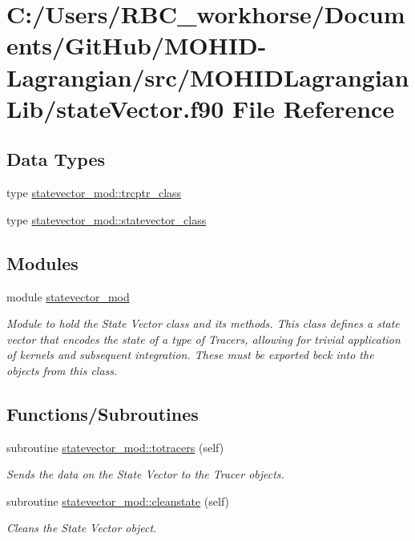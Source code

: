 \hypertarget{state_vector_8f90}{}\section{C\+:/\+Users/\+R\+B\+C\+\_\+workhorse/\+Documents/\+Git\+Hub/\+M\+O\+H\+I\+D-\/\+Lagrangian/src/\+M\+O\+H\+I\+D\+Lagrangian\+Lib/state\+Vector.f90 File Reference}
\label{state_vector_8f90}
\subsection*{Data Types}
\begin{DoxyCompactItemize}
\item 
type \mbox{\hyperlink{structstatevector__mod_1_1trcptr__class}{statevector\+\_\+mod\+::trcptr\+\_\+class}}
\item 
type \mbox{\hyperlink{structstatevector__mod_1_1statevector__class}{statevector\+\_\+mod\+::statevector\+\_\+class}}
\end{DoxyCompactItemize}
\subsection*{Modules}
\begin{DoxyCompactItemize}
\item 
module \mbox{\hyperlink{namespacestatevector__mod}{statevector\+\_\+mod}}
\begin{DoxyCompactList}\small\item\em Module to hold the State Vector class and its methods. This class defines a state vector that encodes the state of a type of Tracers, allowing for trivial application of kernels and subsequent integration. These must be exported beck into the objects from this class. \end{DoxyCompactList}\end{DoxyCompactItemize}
\subsection*{Functions/\+Subroutines}
\begin{DoxyCompactItemize}
\item 
subroutine \mbox{\hyperlink{namespacestatevector__mod_af0831dbae02e8ec94c576224cae673e5}{statevector\+\_\+mod\+::totracers}} (self)
\begin{DoxyCompactList}\small\item\em Sends the data on the State Vector to the Tracer objects. \end{DoxyCompactList}\item 
subroutine \mbox{\hyperlink{namespacestatevector__mod_acb2d2a7c4c5ee5d86a601be7db58c1df}{statevector\+\_\+mod\+::cleanstate}} (self)
\begin{DoxyCompactList}\small\item\em Cleans the State Vector object. \end{DoxyCompactList}\end{DoxyCompactItemize}
